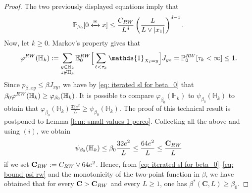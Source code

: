 \documentclass[11pt,a4paper]{article}
\numberwithin{equation}{section}
\theoremstyle{plain}
\theoremstyle{definition}
\newcommand\bfC{\mathbf{C}}
\newcommand{\connect}{\xleftrightarrow}
\begin{document}
\begin{proof}
The two previously displayed equations imply that 
\begin{equation}
\mathbb P_{\beta_0}[0\connect{\mathbb H\:}x]\leq\frac{C_{\rm RW}}{L^d}\left(\frac{L}{L\vee |x_1|}\right)^{d-1}.
\end{equation}
Now, let $k\geq 0$. Markov's property gives that
\begin{equation}
	\varphi^{\rm RW}(\mathbb H_k):=\sum_{\substack{y\in \mathbb H_k\\z\notin \mathbb H_k}}\mathbb E_0^{\rm RW}\Big[\sum_{\ell<\tau_k}\mathds{1}_{X_\ell=y}\Big]J_{yz}=\mathbb P_0^{\rm RW}[\tau_k<\infty]\leq 1.
\end{equation}
Since $p_{\beta,xy}\leq \beta J_{xy}$, we have by \eqref{eq: iterated sl for beta_0} that $\beta_0\varphi^{\rm RW}(\mathbb H_k)\geq \varphi_{\beta_0}(\mathbb H_k)$. It is possible to compare $\varphi_{\beta_0}(\mathbb H_k)$ to $\psi_{\beta_0}(\mathbb H_k)$ to obtain that $\varphi_{\beta_0}(\mathbb H_k)\tfrac{32e^2}{L}\geq \psi_{\beta_0}(\mathbb H_k)$. The proof of this technical result is postponed to Lemma \ref{lem: small values 1 perco}. Collecting all the above and using $(i)$, we obtain
\begin{equation}\label{eq: bound psi rw}
\psi_{\beta_0}(\mathbb H_k)\leq \beta_0\frac{32e^2}{L}\leq\frac{64e^2}{L}\leq\frac{\bfC_{\rm RW}}{L}	
\end{equation}
if we set $\bfC_{\rm RW}:=C_{\rm RW}\vee 64e^2$. Hence, from \eqref{eq: iterated sl for beta_0}--\eqref{eq: bound psi rw} and the monotonicity of the two-point function in $\beta$, we have obtained that for every $\bfC>\bfC_{\rm RW}$ and every $L\geq 1$, one has $\beta^*(\bfC,L)\geq \beta_0$.

\end{proof}
\end{document}
